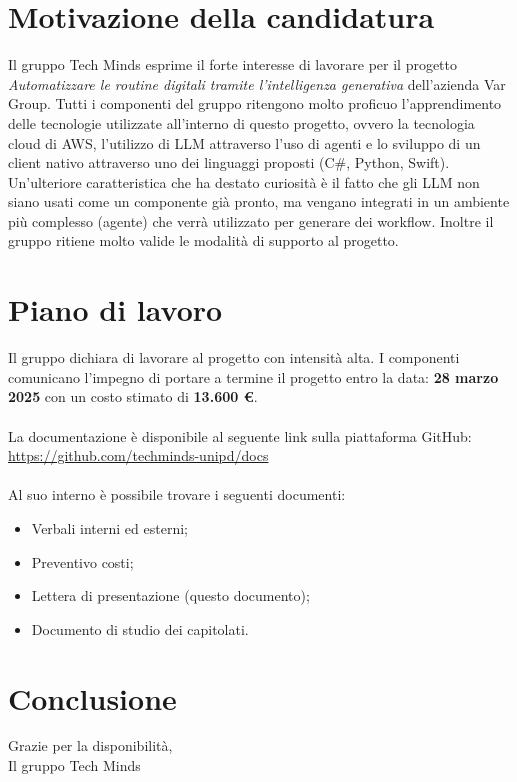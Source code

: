 \documentclass[10pt]{article}
\begin{document}
\newpage
\section{Motivazione della candidatura}
Il gruppo Tech Minds esprime il forte interesse di lavorare per il progetto \textit{Automatizzare le routine digitali tramite l’intelligenza generativa} dell'azienda Var Group.
Tutti i componenti del gruppo ritengono molto proficuo l'apprendimento delle tecnologie utilizzate all'interno di questo progetto, ovvero la tecnologia cloud di AWS, l'utilizzo di LLM attraverso l'uso di agenti e lo sviluppo di un client nativo attraverso uno dei linguaggi proposti (C\#, Python, Swift).
Un'ulteriore caratteristica che ha destato curiosità è il fatto che gli LLM non siano usati come un componente già pronto, ma vengano integrati in un ambiente più complesso (agente) che verrà utilizzato per generare dei workflow.
Inoltre il gruppo ritiene molto valide le modalità di supporto al progetto.

\section{Piano di lavoro}
Il gruppo dichiara di lavorare al progetto con intensità alta. I componenti comunicano l'impegno di portare a termine il progetto entro la data: \textbf{28 marzo 2025} con un costo stimato di \textbf{13.600 \euro}.
\\\\
La documentazione è disponibile al seguente link sulla piattaforma GitHub:\\
\url{https://github.com/techminds-unipd/docs}
\\\\
Al suo interno è possibile trovare i seguenti documenti:
\begin{itemize}
    \item Verbali interni ed esterni;
    \item Preventivo costi;
    \item Lettera di presentazione (questo documento);
    \item Documento di studio dei capitolati.
\end{itemize}

\section{Conclusione}
Grazie per la disponibilità,\\
Il gruppo Tech Minds
\end{document}
